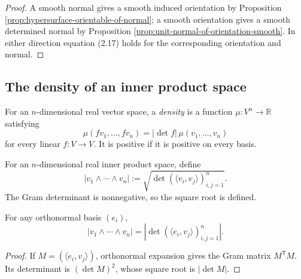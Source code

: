 \begin{proof}
\leanok
{}
\sketch A smooth normal gives a smooth induced orientation by Proposition \ref{prop:hypersurface-orientable-of-normal}; a smooth orientation gives a smooth determined normal by Proposition \ref{prop:unit-normal-of-orientation-smooth}. In either direction equation (2.17) holds for the corresponding orientation and normal.
\end{proof}

\subsection{The density of an inner product space}

\begin{definition}
\label{def:density-vector-space}
\leanok
For an $n$-dimensional real vector space, a \emph{density} is a function $\mu:V^n\to\mathbb R$ satisfying
\begin{equation}
\mu(fv_1,\ldots,fv_n)=|\det f|\,\mu(v_1,\ldots,v_n) \tag{B.14}
\end{equation}
for every linear $f:V\to V$. It is positive if it is positive on every basis.
\end{definition}

\begin{definition}
\label{def:density-pointwise}
\leanok
For an $n$-dimensional real inner product space, define
\[
|v_1\wedge\cdots\wedge v_n|:=\sqrt{\det(\langle v_i,v_j\rangle)_{i,j=1}^n}.
\]
The Gram determinant is nonnegative, so the square root is defined.
\end{definition}

\begin{proposition}
\label{prop:density-abs-det}
\leanok
{}
For any orthonormal basis $(e_i)$,
\[
|v_1\wedge\cdots\wedge v_n|=\left|\det(\langle e_i,v_j\rangle)_{i,j=1}^n\right|.
\]
\end{proposition}

\begin{proof}
\leanok
{}
\sketch If $M=(\langle e_i,v_j\rangle)$, orthonormal expansion gives the Gram matrix $M^{\mathsf T}M$. Its determinant is $(\det M)^2$, whose square root is $|\det M|$.
\end{proof}

